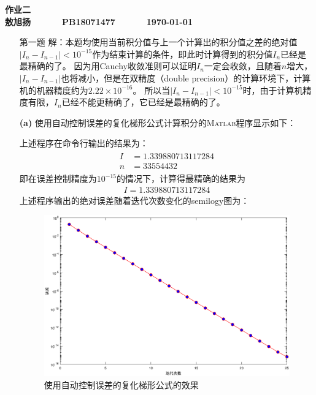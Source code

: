 \documentclass[12pt,a4paper,utf8]{ctexart}
\begin{document}


\begin{center}
   \textbf{作业二}\\
   \textbf{敖旭扬 ~~~~~ PB18071477 ~~~~~ \today}\\
\end{center}
\textit{}
\vspace{\baselineskip}

\begin{enumerate}
   \item[第一题] 解：本题均使用当前积分值与上一个计算出的积分值之差的绝对值$|I_n-I_{n-1}|<10^{-15}$作为结束计算的条件，即此时计算得到的积分值$I_n$已经是最精确的了。
         因为用Cauchy收敛准则可以证明$I_n$一定会收敛，且随着$n$增大，$|I_n-I_{n-1}|$也将减小，但是在双精度（double precision）的计算环境下，计算机的机器精度约为$2.22 \times 10^{−16}$。
         所以当$|I_n-I_{n-1}|<10^{-15}$时，由于计算机精度有限，$I_n$已经不能更精确了，它已经是最精确的了。
   \item[\textbf{(a)}]
         使用自动控制误差的复化梯形公式计算积分的\textsc{Matlab}程序显示如下：
         

         上述程序在命令行输出的结果为：
         \begin{eqnarray}
            \begin{aligned}
               I & =1.339880713117284 \\
               n & =33554432
               \nonumber
            \end{aligned}
         \end{eqnarray}
         即在误差控制精度为$10^{-15}$的情况下，计算得最精确的结果为
         \begin{eqnarray}
            I=1.339880713117284
            \nonumber
         \end{eqnarray}
         上述程序输出的绝对误差随着迭代次数变化的semilogy图为：
         \begin{figure}[H]
            \centering
            \includegraphics[width=1\textwidth]{fig/p1a.eps}
            \caption{使用自动控制误差的复化梯形公式的效果}
         \end{figure}


\end{enumerate}
\end{document}
